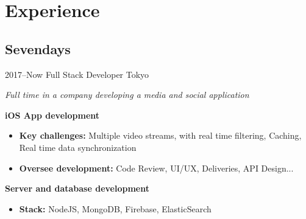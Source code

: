 \documentclass[]{template/friggeri-cv} %
\begin{document}

\section{Experience}


\subsection{Sevendays}
\begin{entrylist}


\entry
{2017--Now}
{Full Stack Developer}
{Tokyo}
{\emph{Full time in a company developing a media and social application}

\textbf{iOS App development} 
\begin{itemize}
\item \textbf{Key challenges:} Multiple video streams, with real time filtering, Caching, Real time data synchronization
\item \textbf{Oversee development:} Code Review, UI/UX, Deliveries, API Design...
\end{itemize}
\textbf{Server and database development} 
\begin{itemize}
\item \textbf{Stack:} NodeJS, MongoDB, Firebase, ElasticSearch

\end{itemize}


}
\end{entrylist}
\end{document}
